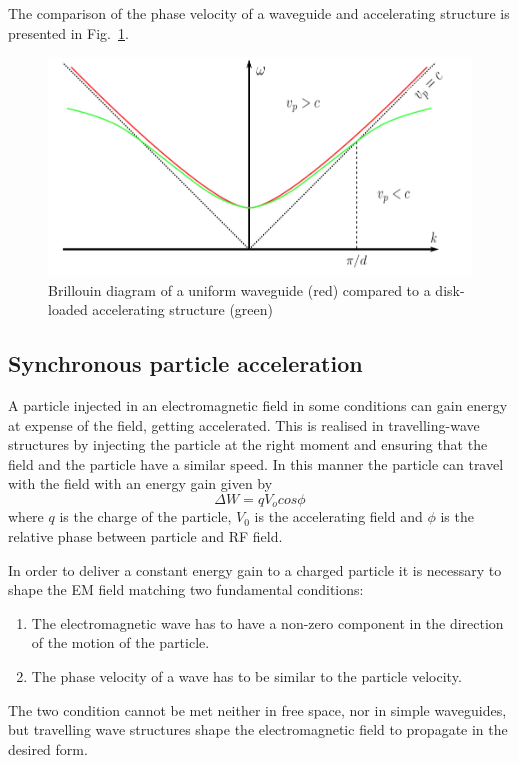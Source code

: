 The comparison of the phase velocity of a waveguide and accelerating structure is presented in Fig.~\ref{vp_fig}.



\begin{figure}[h]
\centering

\includegraphics[scale=0.4]{pictures/vp}
\caption{Brillouin diagram of a uniform waveguide (red) compared to a disk-loaded accelerating structure (green) \cite{Kovermann:1330346}}
\label{vp_fig}

\end{figure}




\subsection[Synchronous particle acceleration]{Synchronous particle acceleration}

A particle injected in an electromagnetic field in some conditions can gain energy at expense of the field, getting accelerated. This is realised in travelling-wave structures by injecting the particle at the right moment and ensuring that the field and the particle have a similar speed. In this manner the particle can travel with the field with an energy gain given by
\begin{equation}
\Delta W = q V_o cos \phi
\end{equation}
where $q$ is the charge of the particle, $V_0$ is the accelerating field and $\phi$ is the relative phase between particle and RF field.

In order to deliver a  constant energy gain to a charged particle it is necessary to shape the EM field matching  two fundamental conditions:

\begin{enumerate}
\item The electromagnetic wave has to have a non-zero component in the direction of the motion of the particle.
\item The phase velocity of a wave has to be similar to the particle velocity.
\end{enumerate}
The two condition cannot be met neither in free space, nor in simple waveguides, but travelling wave structures shape the electromagnetic field to propagate in the desired form.


